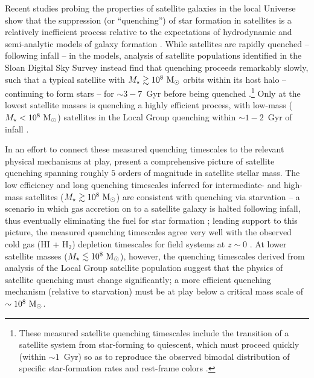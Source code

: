 \documentclass[usenatbib]{mn2e}
\newcommand{\mstar}{{M}_{\star}}
\newcommand{\msun}{{\rm M}_{\odot}}
\begin{document}
Recent studies probing the properties of satellite galaxies in the
local Universe show that the suppression (or ``quenching'') of star
formation in satellites is a relatively inefficient process relative
to the expectations of hydrodynamic and semi-analytic models of galaxy
formation \citep[e.g.][]{kimm09, kimm11, wang14, hirschmann14,
  phillips15a}.
%
While satellites are rapidly quenched -- following infall -- in the
models, analysis of satellite populations identified in the Sloan
Digital Sky Survey \citep[SDSS,][]{york00} instead find that quenching
proceeds remarkably slowly, such that a typical satellite with $\mstar
\gtrsim 10^{8}~\msun$ orbits within its host halo -- continuing to
form stars -- for $\sim3-7$~Gyr before being quenched
\citep{delucia12, wetzel13, wheeler14}.\footnote{These measured
  satellite quenching timescales include the transition of a satellite
  system from star-forming to quiescent, which must proceed quickly
  (within $\sim1$~Gyr) so as to reproduce the observed bimodal
  distribution of specific star-formation rates and rest-frame colors
  \citep{balogh04, wetzel13}.}
%
Only at the lowest satellite masses is quenching a highly efficient
process, with low-mass ($\mstar < 10^{8}~\msun$) satellites in the
Local Group quenching within $\sim1-2$~Gyr of infall \citep{weisz15,
  wetzel15b, fham15}.



In an effort to connect these measured quenching timescales to the
relevant physical mechanisms at play, \citet{fham15} present
a comprehensive picture of satellite quenching spanning
roughly $5$ orders of magnitude in satellite stellar mass.
%
The low efficiency and long quenching timescales inferred for
intermediate- and high-mass satellites ($\mstar \gtrsim 10^{8}~\msun$)
are consistent with quenching via starvation -- a scenario in which
gas accretion on to a satellite galaxy is halted following infall,
thus eventually eliminating the fuel for star formation
\citep{larson80, kawata08};
%
lending support to this picture, the measured quenching timescales
agree very well with the observed cold gas (H{\scriptsize I} +
H$_{2}$) depletion timescales for field systems at $z \sim 0$
\citep{fham15}.
%
At lower satellite masses ($\mstar \lesssim 10^{8}~\msun$), however,
the quenching timescales derived from analysis of the Local Group
satellite population suggest that the physics of satellite quenching
must change significantly; a more efficient quenching mechanism
(relative to starvation) must be at play below a critical mass scale
of $\sim10^{8}~\msun$.
\end{document}
